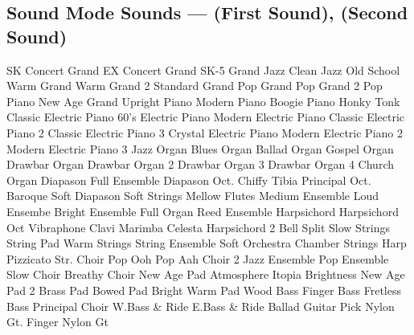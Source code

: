 \subsection[Sound Mode Sounds]{Sound Mode Sounds --- \UiKey{\I}\UiKey{\SND} (First Sound), \UiKey{\II}\UiKey{\SND} (Second Sound)}
SK Concert Grand
EX Concert Grand
SK-5 Grand
Jazz Clean
Jazz Old School
Warm Grand
Warm Grand 2
Standard Grand
Pop Grand
Pop Grand 2
Pop Piano
New Age Grand
Upright Piano
Modern Piano
Boogie Piano
Honky Tonk
Classic Electric Piano
60's Electric Piano
Modern Electric Piano
Classic Electric Piano 2
Classic Electric Piano 3
Crystal Electric Piano
Modern Electric Piano 2
Modern Electric Piano 3
Jazz Organ
Blues Organ
Ballad Organ
Gospel Organ
Drawbar Organ
Drawbar Organ 2
Drawbar Organ 3
Drawbar Organ 4
Church Organ
Diapason
Full Ensemble
Diapason Oct.
Chiffy Tibia
Principal Oct.
Baroque
Soft Diapason
Soft Strings
Mellow Flutes
Medium Ensemble
Loud Ensembe
Bright Ensemble
Full Organ
Reed Ensemble
Harpsichord
Harpsichord Oct
Vibraphone
Clavi
Marimba
Celesta
Harpsichord 2
Bell Split
Slow Strings
String Pad
Warm Strings
String Ensemble
Soft Orchestra
Chamber Strings
Harp
Pizzicato Str.
Choir
Pop Ooh
Pop Aah
Choir 2
Jazz Ensemble
Pop Ensemble
Slow Choir
Breathy Choir
New Age Pad
Atmosphere
Itopia
Brightness
New Age Pad 2
Brass Pad
Bowed Pad
Bright Warm Pad
Wood Bass
Finger Bass
Fretless Bass
Principal Choir
W.Bass \& Ride
E.Bass \& Ride
Ballad Guitar
Pick Nylon Gt.
Finger Nylon Gt
